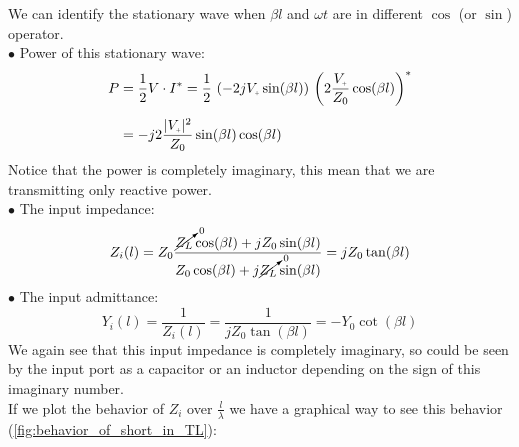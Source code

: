 We can identify the stationary wave when $\beta l$ and $\omega t$ are in different $\cos$ (or $\sin$) operator.\\
$\bullet$ Power of this stationary wave:
\begin{align}
    \begin{split}
      P&=\frac{1}{2}V\cdot I^{*}=\frac{1}{2}\,\left(-2jV\bottomPlus \sin(\beta l)\right)\,\left(2\frac{V\bottomPlus}{Z_0}\cos(\beta l)\right)^*\\[5pt]
      &=-j2\frac{|V\bottomPlus|^2}{Z_0}\sin(\beta l)\cos(\beta l)
    \end{split}
\end{align}
Notice that the power is completely imaginary, this mean that we are transmitting only reactive power.\\
$\bullet$ The input impedance:
\begin{equation}\label{input_impedance_of_a_short}
    Z_i(l)=Z_0\frac{\cancelto{0}{Z_L}\cos(\beta l)+jZ_0 \sin(\beta l)}{Z_0\cos(\beta l)+j\cancelto{0}{Z_L}\sin(\beta l)}=jZ_0\tan(\beta l)
\end{equation}
$\bullet$ The input admittance:
\begin{equation}\label{input_admittance_of_an_open}
    Y_i(l)=\frac{1}{Z_i(l)}=\frac{1}{jZ_0\tan(\beta l)}=-Y_0\cot(\beta l)
\end{equation}
We again see that this input impedance is completely imaginary, so could be seen by the input port as a capacitor or an inductor depending on the sign of this imaginary number.\\
If we plot the behavior of $Z_i$ over $\frac{l}{\lambda}$ we have a graphical way to see this behavior (\cref{fig:behavior_of_short_in_TL}):

